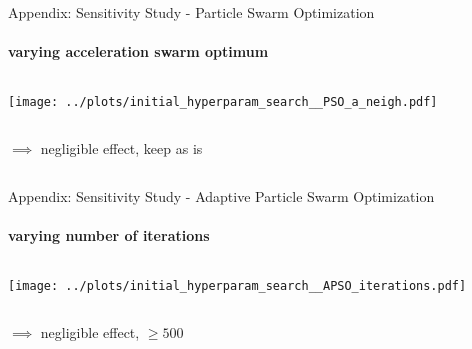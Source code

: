 \documentclass[11pt,aspectratio=169]{beamer}
\begin{document}
%
%

\begin{closingframe}{Appendix: Sensitivity Study - Particle Swarm Optimization}
    \framesubtitle{varying \textbf{acceleration swarm optimum}}

    \begin{columns}
    \begin{column}{0.8\textwidth}
        \texttt{[image: ../plots/initial\_hyperparam\_search\_\_PSO\_a\_neigh.pdf]}
    \end{column}
    \end{columns}

    \begin{columns}
        \begin{column}{0.8\textwidth}
            $\implies$ negligible effect, keep as is
        \end{column}
        \begin{column}{0.1\textwidth}
            \tiny{}
        \end{column}
    \end{columns}
\end{closingframe}

%
%
\begin{closingframe}{Appendix: Sensitivity Study - Adaptive Particle Swarm Optimization}
    \framesubtitle{varying \textbf{number of iterations}}

    \begin{columns}
    \begin{column}{0.8\textwidth}
        \texttt{[image: ../plots/initial\_hyperparam\_search\_\_APSO\_iterations.pdf]}
    \end{column}
    \end{columns}

    \begin{columns}
        \begin{column}{0.8\textwidth}
            $\implies$ negligible effect, $\geq 500$
        \end{column}
        \begin{column}{0.1\textwidth}
            \tiny{}
        \end{column}
    \end{columns}
\end{closingframe}

%
%
\end{document}
